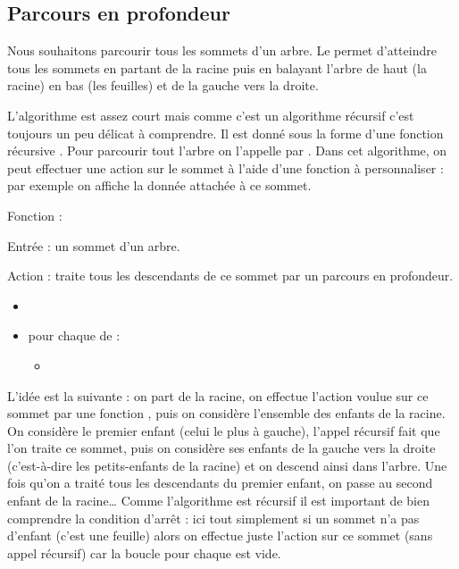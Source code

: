 \documentclass[11pt,class=report,crop=false]{standalone}
\begin{document}
	

\subsection{Parcours en profondeur}


Nous souhaitons parcourir tous les sommets d'un arbre. Le  permet d'atteindre tous les sommets en partant de la racine puis en balayant l'arbre de haut (la racine) en bas (les feuilles) et de la gauche vers la droite.


L'algorithme est assez court mais comme c'est un algorithme récursif c'est toujours un peu délicat à comprendre.
Il est donné sous la forme d'une fonction récursive . Pour parcourir tout l'arbre on l'appelle par 
. Dans cet algorithme, on peut effectuer une action sur le sommet à l'aide d'une fonction  à personnaliser : par exemple on affiche la donnée attachée à ce sommet.


\begin{algorithme}
	Fonction : 	
	
	Entrée : un sommet d'un arbre.
	
	Action : traite tous les descendants de ce sommet par un parcours en profondeur.
	
	\begin{itemize}
		\item {}
        \item pour chaque  de :
        \begin{itemize}			
	       \item {}
        \end{itemize}		
	\end{itemize}  
\end{algorithme}

L'idée est la suivante : on part de la racine, on effectue l'action voulue sur ce sommet par une fonction , puis on considère l'ensemble des enfants de la racine. On considère le premier enfant (celui le plus à gauche), l'appel récursif fait que l'on traite ce sommet, puis on considère ses enfants de la gauche vers la droite (c'est-à-dire les petits-enfants de la racine) et on descend ainsi dans l'arbre. Une fois qu'on a traité tous les descendants du premier enfant, on passe au second enfant de la racine\ldots{}
Comme l'algorithme est récursif il est important de bien comprendre la condition d'arrêt : ici tout simplement si un sommet n'a pas d'enfant (c'est une feuille) alors on effectue juste l'action sur ce sommet (sans appel récursif) car la boucle \og{}pour chaque \fg{} est vide.
\end{document}
